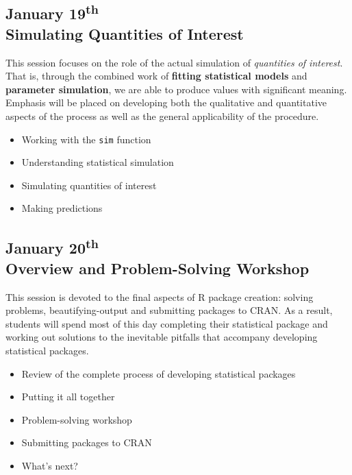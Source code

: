 \documentclass{article}
\begin{document}
\subsection{January 19\textsuperscript{th} \\ Simulating Quantities of Interest}

This session focuses on the role of the actual simulation of \emph{quantities of interest}.
That is, through the combined work of {\bf fitting statistical models} and {\bf parameter
simulation}, we are able to produce values with significant meaning. Emphasis will be placed
on developing both the qualitative and quantitative aspects of the process as well as the 
general applicability of the procedure.

\begin{itemize}
	\item Working with the {\tt sim} function
  \item Understanding statistical simulation
  \item Simulating quantities of interest
  \item Making predictions
\end{itemize}


\subsection{
  January 20\textsuperscript{th} \\
  Overview and Problem-Solving Workshop
}

This session is devoted to the final aspects of R package creation: solving problems, 
beautifying-output and submitting packages to CRAN. As a result, students will spend most of this
day completing their statistical package and working out solutions to the inevitable pitfalls
that accompany developing statistical packages.

\begin{itemize}
	\item Review of the complete process of developing statistical packages
  \item Putting it all together
  \item Problem-solving workshop
  \item Submitting packages to CRAN
  \item What's next?
\end{itemize}
\end{document}
